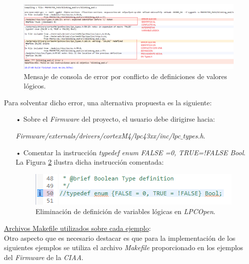 \documentclass[12pt,letterpaper]{article}
\begin{document}
\begin{figure}[!h]
\centering
\includegraphics[width=18 cm]{figuras/f24.png}
\caption{Mensaje de consola de error por conflicto de definiciones de valores lógicos.}
\label{errorboolean}
\end{figure}
Para solventar dicho error, una alternativa propuesta es la siguiente:
\begin{enumerate}
\item[•]Sobre el \textit{Firmware} del proyecto, el usuario debe dirigirse hacia:

\textit{Firmware/externals/drivers/cortexM4/lpc43xx/inc/lpc$\_$types.h}.
\item[•]Comentar la instrucción \textit{typedef enum {FALSE =0, TRUE=!FALSE} Bool}. La Figura \ref{eliminacion} ilustra dicha instrucción comentada:
\begin{figure}[!h]
\centering
\includegraphics[width=12 cm]{figuras/f25.png}
\caption{Eliminación de definición de variables lógicas en \textit{LPCOpen}.}
\label{eliminacion}
\end{figure}
\end{enumerate}\underline{Archivos Makefile utilizados sobre cada ejemplo}: \\
Otro aspecto que es necesario destacar es que para la implementación de los siguientes ejemplos se utiliza el archivo \textit{Makefile} proporcionado en los ejemplos del \textit{Firmware} de la \textit{CIAA}.
\end{document}
